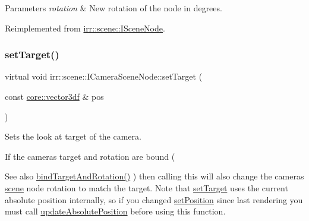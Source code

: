 \begin{DoxyParams}{Parameters}
{\em rotation} & New rotation of the node in degrees. \\
\hline
\end{DoxyParams}


Reimplemented from \hyperlink{classirr_1_1scene_1_1ISceneNode_adb6ff54f52d3a9e1514cd487a550935c}{irr\+::scene\+::\+I\+Scene\+Node}.

\mbox{\label{classirr_1_1scene_1_1ICameraSceneNode_a7280b07fd7915c64350db5a132b4ba07}} 
\subsubsection{\texorpdfstring{set\+Target()}{setTarget()}}
{\footnotesize\ttfamily virtual void irr\+::scene\+::\+I\+Camera\+Scene\+Node\+::set\+Target (\begin{DoxyParamCaption}\item[{const \hyperlink{namespaceirr_1_1core_a06f169d08b5c429f5575acb7edbad811}{core\+::vector3df} \&}]{pos }\end{DoxyParamCaption})\hspace{0.3cm}{\ttfamily [pure virtual]}}



Sets the look at target of the camera. 

If the camera\textquotesingle{}s target and rotation are bound ( \begin{DoxySeeAlso}{See also}
\hyperlink{classirr_1_1scene_1_1ICameraSceneNode_ad8785d7b2f730933a8d4425ac54e7205}{bind\+Target\+And\+Rotation()} ) then calling this will also change the camera\textquotesingle{}s \hyperlink{namespaceirr_1_1scene}{scene} node rotation to match the target. Note that \hyperlink{classirr_1_1scene_1_1ICameraSceneNode_a7280b07fd7915c64350db5a132b4ba07}{set\+Target} uses the current absolute position internally, so if you changed \hyperlink{classirr_1_1scene_1_1ISceneNode_a2166eb0a92cc0e46c49266f41a68ed50}{set\+Position} since last rendering you must call \hyperlink{classirr_1_1scene_1_1ISceneNode_aeb6e0dc034bb2101600ce87acbcf0f6e}{update\+Absolute\+Position} before using this function. 
\end{DoxySeeAlso}

